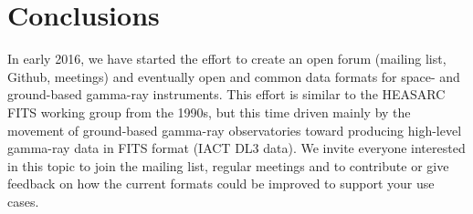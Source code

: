 \section{Conclusions}

In early 2016, we have started the \gadf effort to create an open forum (mailing list, Github, meetings) and eventually open and common data formats for space- and ground-based gamma-ray instruments. This effort is similar to the HEASARC FITS working group from the 1990s, but this time driven mainly by the movement of ground-based gamma-ray observatories toward producing high-level gamma-ray data in FITS format (IACT DL3 data). We invite everyone interested in this topic to join the mailing list, regular meetings and to contribute or give feedback on how the current formats could be improved to support your use cases.
